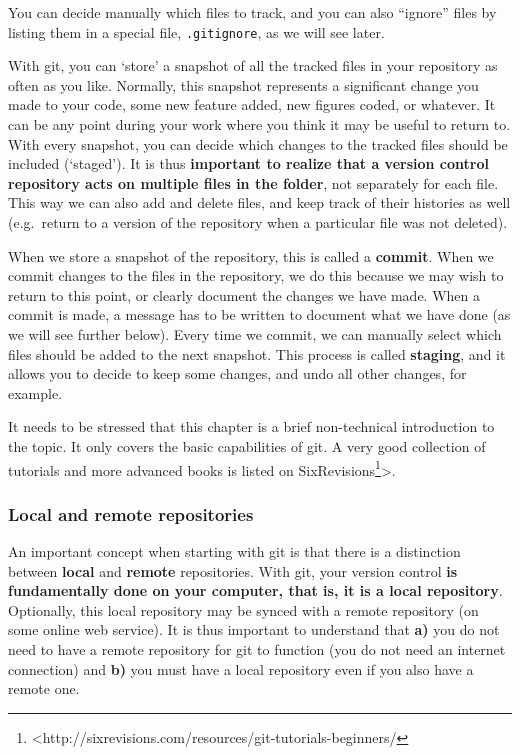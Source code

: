 \documentclass[]{book}
\let\rmarkdownfootnote\footnote%
\def\footnote{\protect\rmarkdownfootnote}
\let\BeginKnitrBlock\begin \let\EndKnitrBlock\end
\begin{document}
You can decide manually which files to track, and you can also ``ignore'' files by listing them in a special file, \texttt{.gitignore}, as we will see later.

With git, you can `store' a snapshot of all the tracked files in your repository as often as you like. Normally, this snapshot represents a significant change you made to your code, some new feature added, new figures coded, or whatever. It can be any point during your work where you think it may be useful to return to. With every snapshot, you can decide which changes to the tracked files should be included (`staged'). It is thus \textbf{important to realize that a version control repository acts on multiple files in the folder}, not separately for each file. This way we can also add and delete files, and keep track of their histories as well (e.g.~return to a version of the repository when a particular file was not deleted).

When we store a snapshot of the repository, this is called a \textbf{commit}. When we commit changes to the files in the repository, we do this because we may wish to return to this point, or clearly document the changes we have made. When a commit is made, a message has to be written to document what we have done (as we will see further below). Every time we commit, we can manually select which files should be added to the next snapshot. This process is called \textbf{staging}, and it allows you to decide to keep some changes, and undo all other changes, for example.

\BeginKnitrBlock{rmdreading}
It needs to be stressed that this chapter is a brief non-technical introduction to the topic. It only covers the basic capabilities of git. A very good collection of tutorials and more advanced books is listed on SixRevisions\footnote{<http://sixrevisions.com/resources/git-tutorials-beginners/}\textgreater{}.
\EndKnitrBlock{rmdreading}

\hypertarget{local-and-remote-repositories}{%
\subsubsection{Local and remote repositories}\label{local-and-remote-repositories}}

An important concept when starting with git is that there is a distinction between \textbf{local} and \textbf{remote} repositories. With git, your version control \textbf{is fundamentally done on your computer, that is, it is a local repository}. Optionally, this local repository may be synced with a remote repository (on some online web service). It is thus important to understand that \textbf{a)} you do not need to have a remote repository for git to function (you do not need an internet connection) and \textbf{b)} you must have a local repository even if you also have a remote one.
\end{document}
